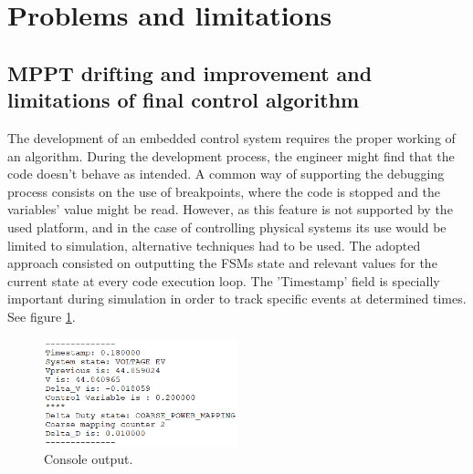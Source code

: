 \section{Problems and limitations}






\subsection{MPPT drifting and improvement and limitations of final control algorithm}
The development of an embedded control system requires the proper working of an algorithm. During the development process, the engineer might find that the code doesn't behave as intended. A common way of supporting the debugging process consists on the use of breakpoints, where the code is stopped and the variables' value might be read. However, as this feature is not supported by the used platform, and in the case of controlling physical systems its use would be limited to simulation, alternative techniques had to be used. The adopted approach consisted on outputting the FSMs state and relevant values for the current state at every code execution loop. The 'Timestamp' field is specially important during simulation in order to track specific events at determined times. See figure \ref{console_output}.

\begin{figure}[htbp]
	\begin{center}
		\includegraphics[width=0.5\textwidth]{../Pictures/P1/Discussion/console_output.png}
		\caption{Console output.}
		\label{console_output}
	\end{center}	
\end{figure}

